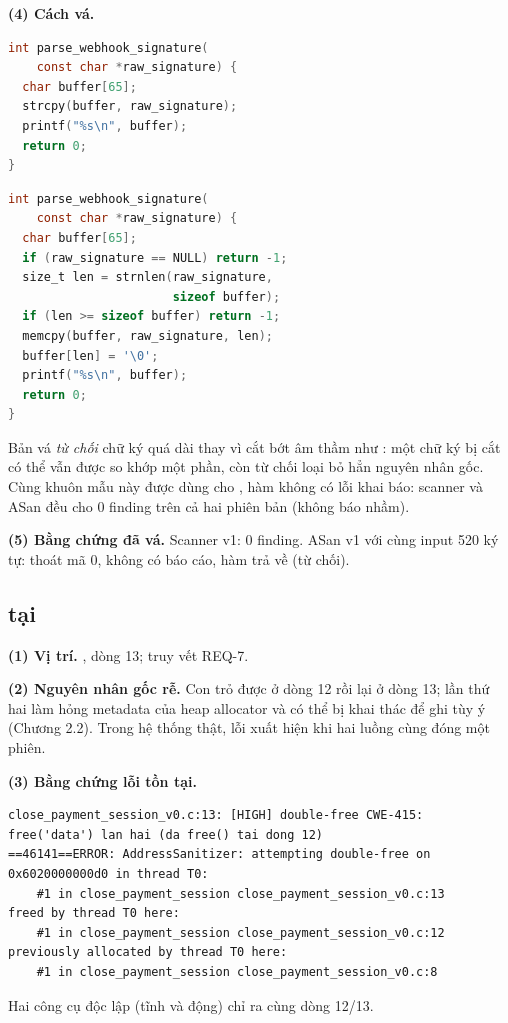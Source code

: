 \textbf{(4) Cách vá.}

\noindent\begin{minipage}[t]{0.49\linewidth}
\begin{lstlisting}[language=C,caption={v0 — có lỗi}]
int parse_webhook_signature(
    const char *raw_signature) {
  char buffer[65];
  strcpy(buffer, raw_signature);
  printf("%s\n", buffer);
  return 0;
}
\end{lstlisting}
\end{minipage}\hfill
\begin{minipage}[t]{0.49\linewidth}
\begin{lstlisting}[language=C,caption={v1 — đã vá}]
int parse_webhook_signature(
    const char *raw_signature) {
  char buffer[65];
  if (raw_signature == NULL) return -1;
  size_t len = strnlen(raw_signature,
                       sizeof buffer);
  if (len >= sizeof buffer) return -1;
  memcpy(buffer, raw_signature, len);
  buffer[len] = '\0';
  printf("%s\n", buffer);
  return 0;
}
\end{lstlisting}
\end{minipage}

Bản vá \emph{từ chối} chữ ký quá dài thay vì cắt bớt âm thầm như : một chữ ký bị cắt
có thể vẫn được so khớp một phần, còn từ chối loại bỏ hẳn nguyên nhân gốc. Cùng khuôn mẫu này được
dùng cho , hàm không có lỗi khai báo: scanner và ASan đều cho 0 finding trên
cả hai phiên bản (không báo nhầm).

\textbf{(5) Bằng chứng đã vá.} Scanner v1: 0 finding. ASan v1 với cùng input 520 ký tự: thoát mã 0,
không có báo cáo, hàm trả về  (từ chối).

\subsection{ tại }
\textbf{(1) Vị trí.} , dòng 13; truy vết REQ-7.

\textbf{(2) Nguyên nhân gốc rễ.} Con trỏ  được  ở dòng 12 rồi lại ở dòng 13;
lần thứ hai làm hỏng metadata của heap allocator và có thể bị khai thác để ghi tùy ý
(Chương 2.2). Trong hệ thống thật, lỗi xuất hiện khi hai luồng cùng đóng một phiên.

\textbf{(3) Bằng chứng lỗi tồn tại.}
\begin{lstlisting}[style=logstyle,caption={Scanner và ASan trên v0.}]
close_payment_session_v0.c:13: [HIGH] double-free CWE-415: free('data') lan hai (da free() tai dong 12)
==46141==ERROR: AddressSanitizer: attempting double-free on 0x6020000000d0 in thread T0:
    #1 in close_payment_session close_payment_session_v0.c:13
freed by thread T0 here:
    #1 in close_payment_session close_payment_session_v0.c:12
previously allocated by thread T0 here:
    #1 in close_payment_session close_payment_session_v0.c:8
\end{lstlisting}
Hai công cụ độc lập (tĩnh và động) chỉ ra cùng dòng 12/13.

